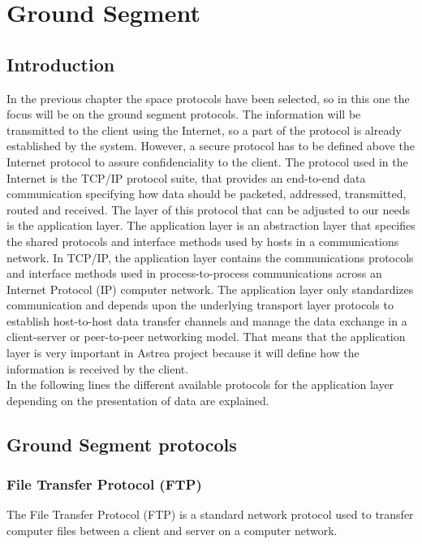 \chapter{Ground Segment}

\section{Introduction}
In the previous chapter the space protocols have been selected, so in this one the focus will be on the ground segment protocols. The information will be transmitted to the client using the Internet, so a part of the protocol is already established by the system. However, a secure protocol has to be defined above the Internet protocol to assure confidenciality to the client. The protocol used in the Internet is the TCP/IP protocol suite, that provides an end-to-end data communication specifying how data should be packeted, addressed, transmitted, routed and received. The layer of this protocol that can be adjusted to our needs is the application layer. The application layer is an abstraction layer that specifies the shared protocols and interface methods used by hosts in a communications network. In TCP/IP, the application layer contains the communications protocols and interface methods used in process-to-process communications across an Internet Protocol (IP) computer network. The application layer only standardizes communication and depends upon the underlying transport layer protocols to establish host-to-host data transfer channels and manage the data exchange in a client-server or peer-to-peer networking model. That means that the application layer is very important in Astrea project because it will define how the information is received by the client.\\
In the following lines the different available protocols for the application layer depending on the presentation of data are explained.

\section{Ground Segment protocols}

\subsection{File Transfer Protocol (FTP)} 
The File Transfer Protocol (FTP) is a standard network protocol used to transfer computer files between a client and server on a computer network.

